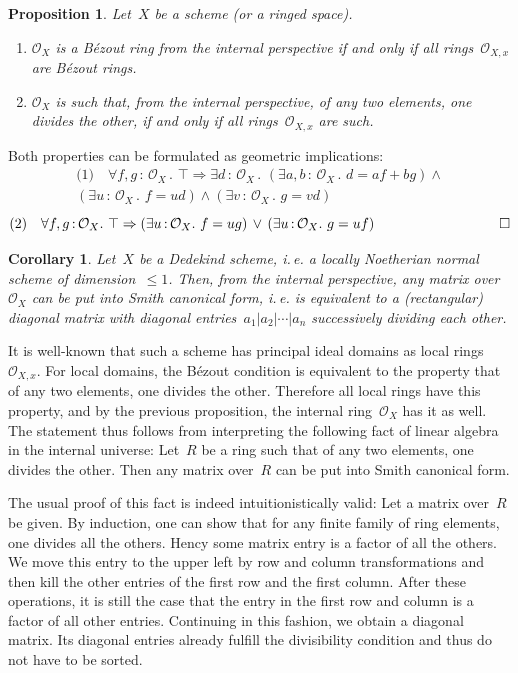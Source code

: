 \documentclass[10pt,reqno,a4paper]{amsbook}
\makeatletter
\theoremstyle{definition}
\theoremstyle{plain}
\newtheorem{prop}[defn]{Proposition}
\newtheorem{cor}[defn]{Corollary}
\theoremstyle{remark}
\renewcommand{\O}{\mathcal{O}}
\newcommand{\?}{\,{:}\,}
\renewcommand{\_}{\mathpunct{.}\,}
\newcommand{\ie}{i.\,e.\@\xspace}
\renewenvironment{proof}[1][\proofname]{\par
  \pushQED{\qed}%
  \normalfont \topsep6\p@\@plus6\p@\relax
  \trivlist
  \item[\hskip\labelsep
        \itshape
    #1\@addpunct{.}]\ignorespaces
}{%
  \popQED\endtrivlist\@endpefalse
}
\makeatother
\begin{document}
\begin{prop}Let~$X$ be a scheme (or a ringed space).
\begin{enumerate}
\item $\O_X$ is a Bézout ring from the internal perspective if and only if all
rings~$\O_{X,x}$ are Bézout rings.
\item $\O_X$ is such that, from the internal perspective, of any two elements,
one divides the other, if and only if all rings~$\O_{X,x}$ are such.
\end{enumerate}
\end{prop}
\begin{proof}Both properties can be formulated as geometric implications:
\begin{multline*}
  \text{(1)}\quad
  \forall f,g\?\O_X\_
  \top \Rightarrow
  \exists d\?\O_X\_
  (\exists a,b\?\O_X\_ d = af + bg) \wedge {} \\
  (\exists u\?\O_X\_ f = ud) \wedge
  (\exists v\?\O_X\_ g = vd)
\end{multline*}
\[
  \text{(2)}\quad
  \forall f,g\?\O_X\_
  \top \Rightarrow
  (\exists u\?\O_X\_ f = ug) \,\vee\,
  (\exists u\?\O_X\_ g = uf) \qquad\qquad\qquad\quad \qedhere
\]
\end{proof}

\begin{cor}\label{cor:dedekind-smith}
Let~$X$ be a Dedekind scheme, \ie a locally Noetherian normal scheme
of dimension~$\leq 1$. Then, from the internal perspective, any matrix
over~$\O_X$ can be put into Smith canonical form, \ie is equivalent to a
(rectangular) diagonal matrix with diagonal entries~$a_1|a_2|\cdots|a_n$
successively dividing each other.
\end{cor}
\begin{proof}It is well-known that such a scheme has principal ideal domains as
local rings~$\O_{X,x}$. For local domains, the Bézout condition is equivalent to the
property that of any two elements, one divides the other. Therefore all local
rings have this property, and by the previous proposition, the internal
ring~$\O_X$ has it as well. The statement thus follows from interpreting the
following fact of linear algebra in the internal universe: Let~$R$ be a ring
such that of any two elements, one divides the other. Then any matrix over~$R$
can be put into Smith canonical form.

The usual proof of this fact is indeed intuitionistically valid: Let a
matrix over~$R$ be given. By induction, one can show that for any finite family
of ring elements, one divides all the others. Hency some matrix entry is a factor
of all the others. We move this entry to the upper left by row and column
transformations and then kill the other entries of the first row and the first
column. After these operations, it is still the case that the entry in the
first row and column is a factor of all other entries. Continuing in this
fashion, we obtain a diagonal matrix. Its diagonal entries already fulfill
the divisibility condition and thus do not have to be sorted.
\end{proof}
\end{document}
